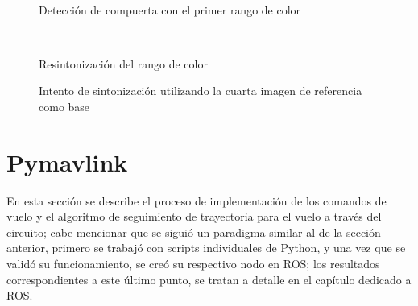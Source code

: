 \begin{figure}[ht]
    \centering
    \hfill
    \\
    \hfill
    \hfill

    \caption{Detección de compuerta con el primer rango de color}
    \label{fig:cv_gatesth1}
\end{figure}

\begin{figure}[ht]
    \centering
    \hfill
    \\
    \hfill
    \hfill

    \caption{Resintonización del rango de color}
    \label{fig:cv_gatesth2}
\end{figure}

\begin{figure}[ht]
    \centering
    \hfill

    \caption{Intento de sintonización utilizando la cuarta imagen de referencia como base}
    \label{fig:cv_gatesth3}
\end{figure}



\section{Pymavlink}
En esta sección se describe el proceso de implementación de los comandos de vuelo y el algoritmo de seguimiento de trayectoria para el vuelo a través del circuito; cabe mencionar que se siguió un paradigma similar al de la sección anterior, primero se trabajó con scripts individuales de Python, y una vez que se validó su funcionamiento, se creó su respectivo nodo en ROS; los resultados correspondientes a este último punto, se tratan a detalle en el capítulo dedicado a ROS.

